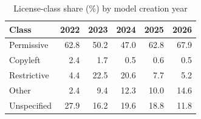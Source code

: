 \begin{table}[h]
\caption{License-class share (\%) by model creation year}
\label{tab:license}
\centering
\small
\begin{tabular}{lrrrrr}
\toprule
Class & 2022 & 2023 & 2024 & 2025 & 2026 \\
\midrule
Permissive & 62.8 & 50.2 & 47.0 & 62.8 & 67.9 \\
Copyleft & 2.4 & 1.7 & 0.5 & 0.6 & 0.5 \\
Restrictive & 4.4 & 22.5 & 20.6 & 7.7 & 5.2 \\
Other & 2.4 & 9.4 & 12.3 & 10.0 & 14.6 \\
Unspecified & 27.9 & 16.2 & 19.6 & 18.8 & 11.8 \\
\bottomrule
\end{tabular}
\normalsize
\end{table}
